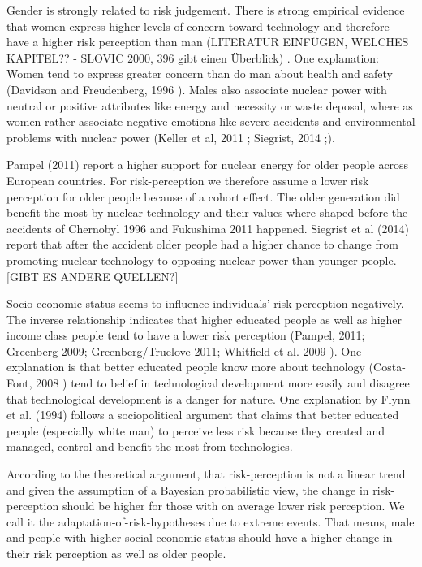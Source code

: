 Gender is strongly related to risk judgement. There is strong empirical evidence that women express higher levels of concern toward technology and therefore have a higher risk perception than man (LITERATUR EINFÜGEN, WELCHES KAPITEL?? - SLOVIC 2000, 396 gibt einen Überblick) \citep{Slovic:2000tx}. One explanation: Women tend to express greater concern than do man about health and safety (Davidson and Freudenberg, 1996 \citep{Davidson:1996uk}).  Males also associate nuclear power with neutral or positive attributes like energy and necessity or waste deposal, where as women rather associate negative emotions like severe accidents and environmental problems with nuclear power (Keller et al, 2011 \citep{Keller:2011gb}; Siegrist, 2014 \citep{Siegrist:2014ji};).  

Pampel (2011) \citep{Pampel:2011cx} report a higher support for nuclear energy for older people across European countries. For risk-perception we therefore assume a lower risk perception for older people because of a cohort effect. The older generation did benefit the most by nuclear technology and their values where shaped before the accidents of Chernobyl 1996 and Fukushima 2011 happened. Siegrist et al (2014) \citep{Siegrist:2014ji} report that after the accident older people had a higher chance to change from promoting nuclear technology to opposing nuclear power than younger people. [GIBT ES ANDERE QUELLEN?]       
 
Socio-economic status seems to influence individuals' risk perception negatively. The inverse relationship indicates that higher educated people as well as higher income class people tend to have a lower risk perception (Pampel, 2011; Greenberg 2009; Greenberg/Truelove 2011; Whitfield et al. 2009 \citep{Pampel:2011cx,Greenberg:2009fx,Greenberg:2011ja,Whitfield:2009ku}).  One explanation is that better educated people know more about technology (Costa-Font, 2008 \citep{CostaFont:2008hf}) tend to belief in technological development more easily and disagree that technological development is a danger for nature.  One explanation by Flynn et al. (1994) \citep{Flynn:1994dn} follows a sociopolitical argument that claims that better educated people (especially white man) to perceive less risk because they created and managed, control and benefit the most from technologies. 

According to the theoretical argument, that risk-perception is not a linear trend and given the assumption of a Bayesian probabilistic view, the change in risk-perception should be higher for those with on average lower risk perception. We call it the adaptation-of-risk-hypotheses due to extreme events. That means, male and people with higher social economic status should have a higher change in their risk perception as well as older people. 
 
